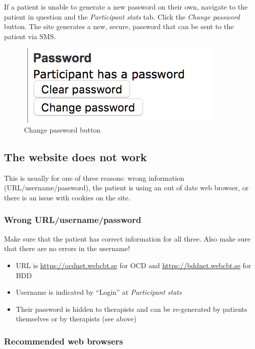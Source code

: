 \documentclass[]{book}
\providecommand{\tightlist}{%
  \setlength{\itemsep}{0pt}\setlength{\parskip}{0pt}}
\begin{document}
If a patient is unable to generate a new password on their own, navigate to the patient in question and the \emph{Participant stats} tab. Click the \emph{Change password} button. The site generates a new, secure, password that can be sent to the patient via SMS.

\begin{figure}
\centering
\includegraphics{images/change-password.png}
\caption{Change password button}
\end{figure}

\hypertarget{the-website-does-not-work}{%
\subsection{The website does not work}\label{the-website-does-not-work}}

This is usually for one of three reasons: wrong information (URL/username/password), the patient is using an out of date web browser, or there is an issue with cookies on the site.

\hypertarget{wrong-urlusernamepassword}{%
\subsubsection{Wrong URL/username/password}\label{wrong-urlusernamepassword}}

Make sure that the patient has correct information for all three. Also make sure that there are no errors in the username!

\begin{itemize}
\tightlist
\item
  URL is \url{https://ocdnet.webcbt.se} for OCD and \url{https://bddnet.webcbt.se} for BDD
\item
  Username is indicated by ``Login'' at \emph{Participant stats}
\item
  Their password is hidden to therapists and can be re-generated by patients themselves or by therapists (see above)
\end{itemize}

\hypertarget{recommended-web-browsers}{%
\subsubsection{Recommended web browsers}\label{recommended-web-browsers}}
\end{document}
